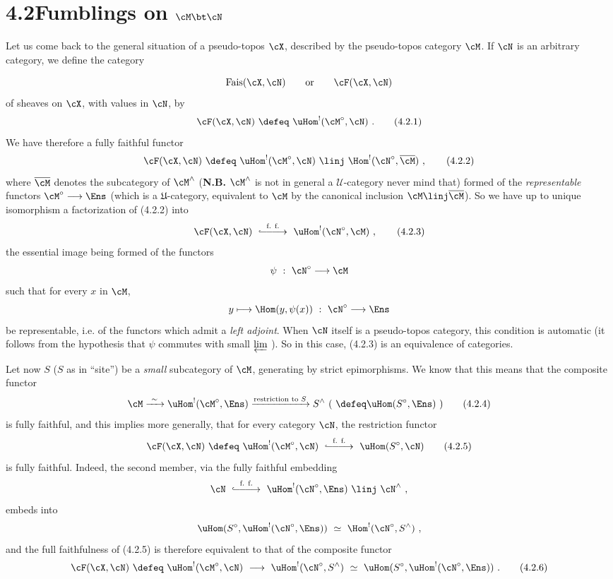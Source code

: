 \section*{4.2\quad Fumblings on $\cM \bt \cN$}

Let us come back to the general situation of a pseudo-topos $\cX$, described by the pseudo-topos category $\cM$. If $\cN$ is an arbitrary category, we define the category

\[
\mathrm{Fais}(\cX,\cN) \qquad \text{or} \qquad \cF(\cX,\cN)
\]
of sheaves on $\cX$, with values in $\cN$, by
\[
\cF(\cX,\cN) \ \defeq\ \uHom^{!}(\cM^{\circ},\cN) \ .
\tag*{(4.2.1)}
\]
We have therefore a fully faithful functor
\[
\cF(\cX,\cN) \ \defeq\ \uHom^{!}(\cM^{\circ},\cN) \ \linj\ \Hom^{!}(\cN^{\circ},\overline{\cM}) \ ,
\tag*{(4.2.2)}
\]
where $\overline{\cM}$ denotes the subcategory of $\cM^{\wedge}$ (\textbf{N.B.} $\cM^{\wedge}$ is not in general a $\mathcal{U}$-category never mind that) formed of the \textit{representable} functors $\cM^{\circ}\longrightarrow\Ens$ (which is a $\mathfrak{U}$-category, equivalent to $\cM$ by the canonical inclusion $\cM \linj \overline{\cM}$). So we have up to unique isomorphism a factorization of (4.2.2) into
\[
\cF(\cX,\cN) \ \overset{\text{f. f.}}{\lhook\joinrel\relbar\joinrel\relbar\joinrel\longrightarrow}\ \uHom^{!}(\cN^{\circ},\cM) \ ,
\tag*{(4.2.3)}
\]
the essential image being formed of the functors
\[
\psi \ :\ \cN^{\circ} \longrightarrow \cM
\]
such that for every $x$ in $\cM$,
\[
y \longmapsto \Hom(y,\psi(x)) \ :\ \cN^{\circ} \longrightarrow \Ens
\]
be representable, i.e. of the functors which
admit a \textit{left adjoint}. When $\cN$ itself is a pseudo-topos category, this condition is automatic (it follows from the hypothesis that $\psi$ commutes with small $\varprojlim$ ). So in this case, (4.2.3) is an equivalence of categories.

Let now $S$ ($S$ as in ``site'') be a \textit{small} subcategory of $\cM$, generating by strict epimorphisms. We know that this means that the composite functor
\[
\cM \xrightarrow{\ \sim\ } \uHom^{!}(\cM^{\circ},\Ens) \xrightarrow{\text{restriction to } S} S^{\wedge} \ (\ \defeq \uHom(S^{\circ},\Ens)\ )
\tag*{(4.2.4)}
\]
is fully faithful, and this implies more generally, that for every category $\cN$, the restriction functor
\[
\cF(\cX,\cN) \ \defeq\ \uHom^{!}(\cM^{\circ},\cN) \ \overset{\text{f. f.}}{\lhook\joinrel\relbar\joinrel\relbar\joinrel\longrightarrow}\ \uHom(S^{\circ},\cN)
\tag*{(4.2.5)}
\]
is fully faithful. Indeed, the second member, via the fully faithful embedding
\[
\cN \ \overset{\text{f. f.}}{\lhook\joinrel\relbar\joinrel\relbar\joinrel\longrightarrow}\ \uHom^{!}(\cN^{\circ},\Ens) \ \linj\ \cN^{\wedge} \ ,
\]
embeds into
\[
\uHom(S^{\circ},\uHom^{!}(\cN^{\circ},\Ens)) \ \simeq\ \Hom^{!}(\cN^{\circ},S^{\wedge}) \ ,
\]
and the full faithfulness of (4.2.5) is therefore equivalent to that of the composite functor
\[
\cF(\cX,\cN) \ \defeq\ \uHom^{!}(\cM^{\circ},\cN) \ \longrightarrow\ \uHom^{!}(\cN^{\circ},S^{\wedge}) \ \simeq\ \uHom(S^{\circ},\uHom^{!}(\cN^{\circ},\Ens)) \ .
\tag*{(4.2.6)}
\]

